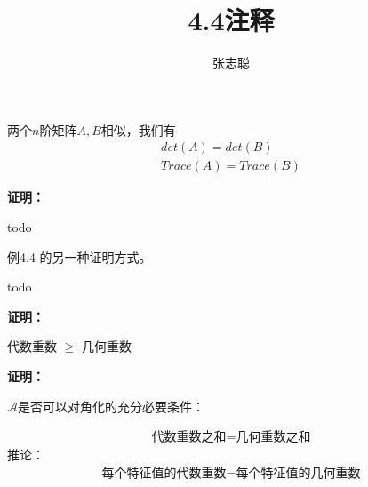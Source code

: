 \documentclass{article}
\begin{document}
\title{4.4注释}
\author{张志聪}
\maketitle

\begin{zremark}
  两个$n$阶矩阵$A, B$相似，我们有
  \begin{align*}
    det(A) = det(B) \\
    Trace(A) = Trace(B)
  \end{align*}
\end{zremark}

\textbf{证明：}

todo

\begin{zremark}
  例4.4 的另一种证明方式。
\end{zremark}

todo

\textbf{证明：}


\begin{zremark}
  代数重数 $\geq$ 几何重数
\end{zremark}

\textbf{证明：}

\begin{zremark}
  $\mathscr{A}$是否可以对角化的充分必要条件：

  \begin{align*}
    \textbf{代数重数之和} = \textbf{几何重数之和}
  \end{align*}
  推论：
  \begin{align*}
    \textbf{每个特征值的代数重数} = \textbf{每个特征值的几何重数}
  \end{align*}

\end{zremark}
\end{document}
